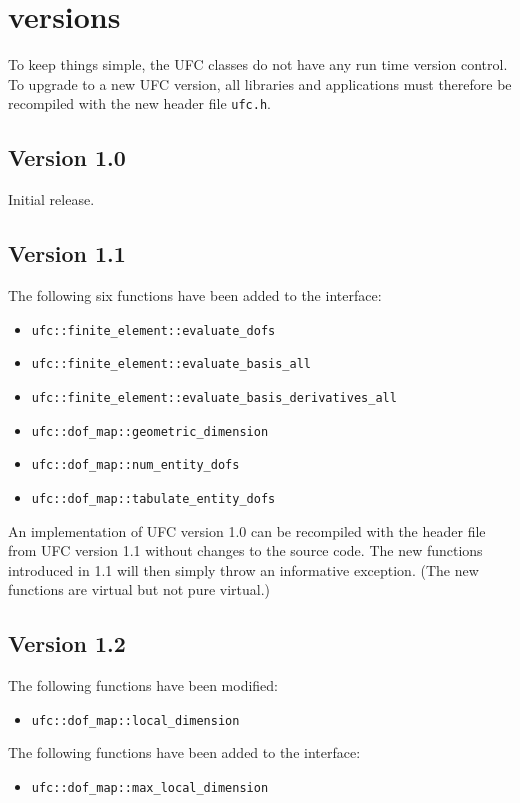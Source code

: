 \chapter{\ufc{} versions}
\label{app:versions}

To keep things simple, the UFC classes do not have any run time
version control. To upgrade to a new UFC version, all libraries and
applications must therefore be recompiled with the new header file
\texttt{ufc.h}.

\section{Version 1.0}

Initial release.

\section{Version 1.1}

The following six functions have been added to the interface:
\begin{itemize}
\item \texttt{ufc::finite\_element::evaluate\_dofs}
\item \texttt{ufc::finite\_element::evaluate\_basis\_all}
\item \texttt{ufc::finite\_element::evaluate\_basis\_derivatives\_all}
\item \texttt{ufc::dof\_map::geometric\_dimension}
\item \texttt{ufc::dof\_map::num\_entity\_dofs}
\item \texttt{ufc::dof\_map::tabulate\_entity\_dofs}
\end{itemize}

An implementation of UFC version 1.0 can be recompiled with the header
file from UFC version 1.1 without changes to the source code. The new
functions introduced in 1.1 will then simply throw an informative
exception. (The new functions are virtual but not pure virtual.)

\section{Version 1.2}

The following functions have been modified:
\begin{itemize}
\item \texttt{ufc::dof\_map::local\_dimension}
\end{itemize}
The following functions have been added to the interface:
\begin{itemize}
\item \texttt{ufc::dof\_map::max\_local\_dimension}
\end{itemize}

